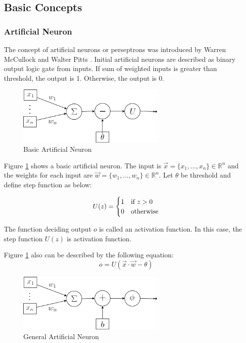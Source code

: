 \documentclass[draft,dvipsnames]{drexel-thesis}
\begin{document}
\begin{thesis}
\subsection{Basic Concepts}\label{subsec:basicDL}

\subsubsection{Artificial Neuron}\label{subsubsec:AN}
The concept of artificial neurons or perseptrons was introduced by Warren McCullock and Walter Pitts \cite{raschka2015python}. Initial artificial neurons are described as binary output logic gate from inputs. If sum of weighted inputs is greater than threshold, the output is 1. Otherwise, the output is 0.

\begin{figure}[t!]
    \centering
    \includegraphics[width=0.65\textwidth]{pictures/figures/basic_AN.png}
    \caption{Basic Artificial Neuron}
    \label{fig:basic_AN}
\end{figure}

Figure \ref{fig:basic_AN} shows a basic artificial neuron. The input is $\vec{x} = \{x_1, ..., x_n\} \in \mathbb{R}^n$ and the weights for each input are $\vec{w} = \{w_1, ..., w_n\} \in \mathbb{R}^n$. Let $\theta$ be threshold and define step function as below:

$$U(z)=
	\begin{cases}
		\hfill 1 \hfill & \text{if $z > 0$} \\
		\hfill 0 \hfill & \text{otherwise} \\
	\end{cases}
$$

The function deciding output $o$ is called an activation function. In this case, the step function $U(z)$ is activation function.

Figure \ref{fig:basic_AN} also can be described by the following equation:
$$ o = U(\vec{x}\cdot\vec{w}-\theta)$$

\begin{figure}[t!]
    \centering
    \includegraphics[width=0.65\textwidth]{pictures/figures/general_AN.png}
    \caption{General Artificial Neuron}
    \label{fig:general_AN}
\end{figure}


\end{thesis}
\end{document}
